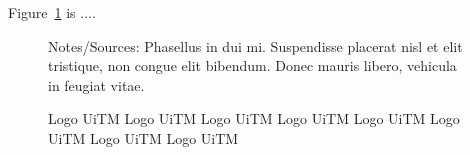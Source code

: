 Figure~\ref{fig:logouitm} is $\dots$. \lipsum[1-2]

\begin{figure}[ht]
    \centering
    \caption[Short version for LoF]{Logo UiTM Logo UiTM Logo UiTM Logo UiTM Logo UiTM Logo UiTM Logo UiTM Logo UiTM}
    \label{fig:logouitm}

    \par\raggedright
    Notes/Sources: Phasellus in dui mi. Suspendisse placerat nisl et elit tristique, non congue elit bibendum. Donec mauris libero, vehicula in feugiat vitae.
\end{figure}

\lipsum[2-3]

